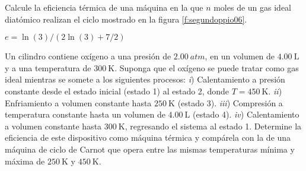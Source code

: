 %
\begin{Exercise}\label{p:segundoppio06}
  Calcule la eficiencia térmica de una máquina en la que $n$ moles de un gas ideal diatómico realizan el ciclo mostrado en la figura \ref{f:segundoppio06}.
\end{Exercise}
\begin{Answer}
	\begin{minipage}[t]{.4\textwidth}
    $e = \ln{(3)}/(2\ln{(3)}+7/2)$
  \end{minipage}
\end{Answer}
%
\begin{center}
\end{center}
%
\begin{Exercise}
  Un cilindro contiene oxígeno a una presión de $\SI{2.00}{atm}$, en un volumen de $\SI{4.00}{\liter}$ y a una temperatura de $\SI{300}{\kelvin}$. Suponga que el oxígeno se puede tratar como gas ideal mientras se somete a los siguientes procesos: \textit{i}) Calentamiento a presión constante desde el estado inicial (estado 1) al estado 2, donde $T = \SI{450}{\kelvin}$. \textit{ii}) Enfriamiento a volumen constante hasta $\SI{250}{\kelvin}$ (estado 3). \textit{iii}) Compresión a temperatura constante hasta un volumen de $\SI{4.00}{\liter}$ (estado 4). \textit{iv}) Calentamiento a volumen constante hasta $\SI{300}{\kelvin}$, regresando el sistema al estado 1. Determine la eficiencia de este dispositivo como máquina térmica y compárela con la de una máquina de ciclo de Carnot que opera entre las mismas temperaturas mínima y máxima de $\SI{250}{\kelvin}$ y $\SI{450}{\kelvin}$.
\end{Exercise}
